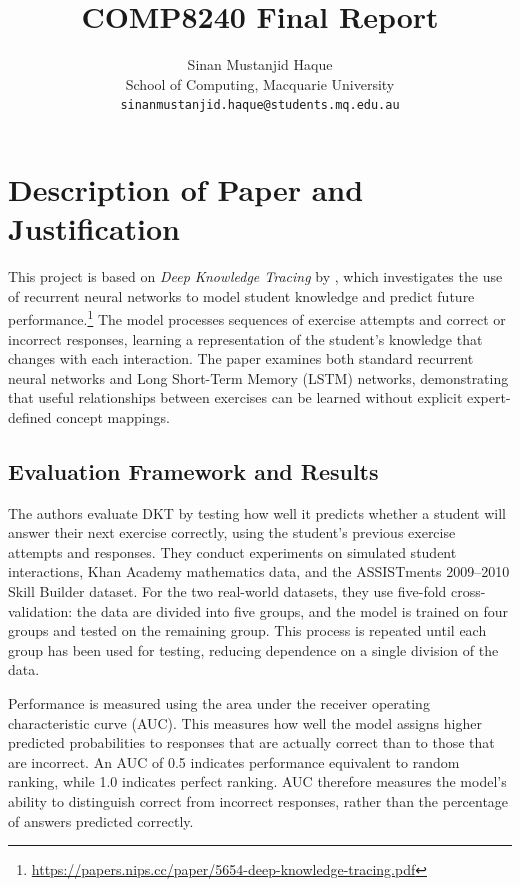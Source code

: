 \documentclass[11pt]{article}
\title{COMP8240 Final Report}
\author{Sinan Mustanjid Haque \\
  School of Computing, Macquarie University \\
  \texttt{sinanmustanjid.haque@students.mq.edu.au} \\
}
\begin{document}
\maketitle


\section{Description of Paper and Justification}


This project is based on \textit{Deep Knowledge Tracing} by \citet{piech2015deep}, which investigates the use of recurrent neural networks to model student knowledge and predict future performance.\footnote{\url{https://papers.nips.cc/paper/5654-deep-knowledge-tracing.pdf}} The model processes sequences of exercise attempts and correct or incorrect responses, learning a representation of the student's knowledge that changes with each interaction. The paper examines both standard recurrent neural networks and Long Short-Term Memory (LSTM) networks, demonstrating that useful relationships between exercises can be learned without explicit expert-defined concept mappings.

\subsection{Evaluation Framework and Results}

The authors evaluate DKT by testing how well it predicts whether a student will answer their next exercise correctly, using the student's previous exercise attempts and responses. They conduct experiments on simulated student interactions, Khan Academy mathematics data, and the ASSISTments 2009--2010 Skill Builder dataset. For the two real-world datasets, they use five-fold cross-validation: the data are divided into five groups, and the model is trained on four groups and tested on the remaining group. This process is repeated until each group has been used for testing, reducing dependence on a single division of the data.

Performance is measured using the area under the receiver operating characteristic curve (AUC). This measures how well the model assigns higher predicted probabilities to responses that are actually correct than to those that are incorrect. An AUC of 0.5 indicates performance equivalent to random ranking, while 1.0 indicates perfect ranking. AUC therefore measures the model's ability to distinguish correct from incorrect responses, rather than the percentage of answers predicted correctly.
\end{document}

